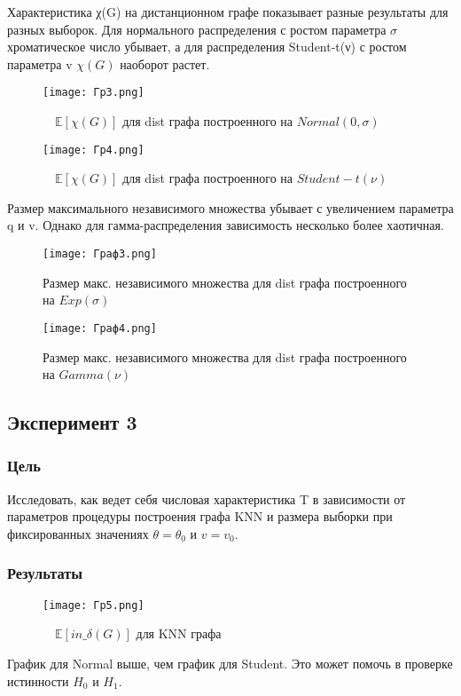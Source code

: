 \documentclass[a4paper, 12pt]{article}
\begin{document}
Характеристика χ(G) на дистанционном графе показывает разные результаты для разных выборок. Для нормального распределения с ростом параметра $\sigma$ хроматическое число убывает, а для распределения Student-t(ν) с ростом параметра v $\chi(G)$ наоборот растет.\\

\begin{figure}[H]
    \centering
    \texttt{[image: Гр3.png]}
    \caption{$\quad \mathbb{E}[\chi(G)]$ для dist графа построенного на $Normal(0,\sigma)$}
    \label{fig:uml}
\end{figure}

\begin{figure}[H]
    \centering
    \texttt{[image: Гр4.png]}
    \caption{$\quad \mathbb{E}[\chi(G)]$ для dist графа построенного на $Student-t(ν)$}
    \label{fig:uml}
\end{figure}

Размер максимального независимого множества убывает с увеличением параметра q и v. Однако для гамма-распределения зависимость несколько более хаотичная.

\begin{figure}[H]
    \centering
    \texttt{[image: Граф3.png]}
    \caption{Размер макс. независимого множества для dist графа построенного на $Exp(\sigma)$}
    \label{fig:uml}
\end{figure}

\begin{figure}[H]
    \centering
    \texttt{[image: Граф4.png]}
    \caption{Размер макс. независимого множества для dist графа построенного на $Gamma(ν)$}
    \label{fig:uml}
\end{figure}

\subsection{Эксперимент 3}
\subsubsection{Цель}
Исследовать, как ведет себя числовая характеристика T в зависимости
от параметров процедуры построения графа KNN и размера выборки при
фиксированных значениях $\theta = \theta_0$ и $v = v_0$.\\
\subsubsection{Результаты}
\begin{figure}[H]
    \centering
    \texttt{[image: Гр5.png]}
    \caption{$\quad \mathbb{E}[in\_\delta(G)]$ для KNN графа}
    \label{fig:uml}
\end{figure}
График для Normal выше, чем график для Student. Это может помочь в проверке истинности $H_0$ и $H_1$. \\
\end{document}
